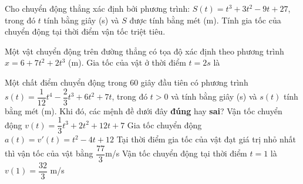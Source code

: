 \begin{ex}%
	Cho chuyển động thẳng xác định bởi phương trình: $S(t)=t^3+3 t^2-9 t+27$, trong đó $t$ tính bằng giây (s) và $S$ được tính bằng mét (m). Tính gia tốc của chuyển động tại thời điểm vận tốc triệt tiêu.
\end{ex}

\begin{bt}%
	Một vật chuyển động trên đường thẳng có tọa độ xác định theo phương trình $x=6+7 t^2+2 t^3$ (m). Gia tốc của vật ở thời điểm $t=2 s$ là
\end{bt}

\begin{ex}%
Một chất điểm chuyển động trong $60$ giây đầu tiên có phương trình \break$s(t)=\dfrac{1}{12}t^4-\dfrac{2}{3}t^3+6t^2+7t$, trong đó $t>0$ và tính bằng giây (s) và $s(t)$ tính bằng mét (m). Khi đó, các mệnh đề dưới đây \textbf{đúng} hay \textbf{sai}?\choiceTF
{Vận tốc chuyển động $v(t)=\dfrac{1}{3}t^3+2t^2+12t+7$}
{\True 	Gia tốc chuyển động $a(t)=v'(t)=t^2-4t+12$}
{\True Tại thời điểm gia tốc của vật đạt giá trị nhỏ nhất thì vận tốc của vật bằng $\dfrac{77}{3} $m/s}
{Vận tốc chuyển động tại thời điểm $t=1$ là $v(1)=\dfrac{32}{3}$ m/s}
\end{ex}

